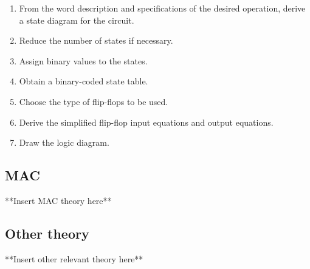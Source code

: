 \begin{enumerate}
  \item From the word description and specifications of the desired operation, derive a state diagram for the circuit.
  \item Reduce the number of states if necessary.
  \item Assign binary values to the states.
  \item Obtain a binary-coded state table.
  \item Choose the type of flip-flops to be used.
  \item Derive the simplified flip-flop input equations and output equations.
  \item Draw the logic diagram.
\end{enumerate}


\subsection{MAC}
\label{subsec:MAC_theory}

**Insert MAC theory here**




\subsection{Other theory}\label{subsec:theory_aSubsection}

**Insert other relevant theory here**



